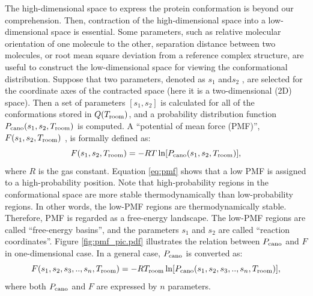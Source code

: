 The high-dimensional space to express the protein conformation is beyond our comprehension. Then, contraction of the high-dimensional space into a low-dimensional space is essential. Some parameters, such as relative molecular orientation of one molecule to the other, separation distance between two molecules, or root mean square deviation from a reference complex structure, are useful to construct the low-dimensional space for viewing the conformational distribution. Suppose that two parameters, denoted as  $s_1$ and$s_2$ , are selected for the coordinate axes of the contracted space (here it is a two-dimensional (2D) space). Then a set of parameters $[s_1, s_2]$ is calculated for all of the conformations stored in $Q(T_{\rm room})$, and a probability distribution function $P_{\rm cano}(s_1, s_2, T_{\rm room})$ is computed. A “potential of mean force (PMF)”, $F(s_1, s_2, T_{\rm room})$ , is formally defined as:
\begin{equation}
F(s_1, s_2, T_{\rm room})=-RT \ln [P_{\rm cano}(s_1, s_2, T_{\rm room})],
\label{eq:pmf}
\end{equation}
where $R$ is the gas constant. Equation \ref{eq:pmf} shows that a low PMF is assigned to a high-probability position. Note that high-probability regions in the conformational space are more stable thermodynamically than low-probability regions. In other words, the low-PMF regions are thermodynamically stable. Therefore, PMF is regarded as a free-energy landscape. The low-PMF regions are called “free-energy basins”, and the parameters $s_1$ and $s_2$ are called “reaction coordinates”. Figure \ref{fig:pmf_pic.pdf} illustrates the relation between $P_{\rm cano}$ and $F$ in one-dimensional case. In a general case, $P_{\rm cano}$ is converted as:
\begin{equation}
F(s_1,s_2,s_3,..,s_n, T_{\rm room})=-RT_{\rm room} \ln [P_{\rm cano}(s_1,s_2,s_3,..,s_n, T_{\rm room})],
\label{eq:pmf_gene}
\end{equation}
where both $P_{\rm cano}$ and $F$  are expressed by $n$ parameters.
